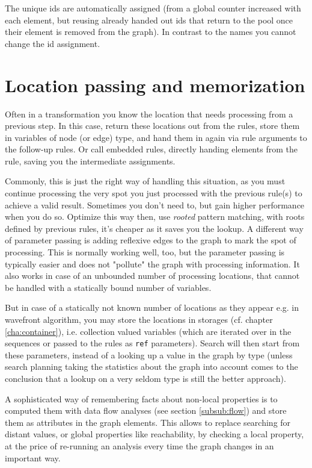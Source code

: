 The unique ids are automatically assigned (from a global counter increased with each element, but reusing already handed out ids that return to the pool once their element is removed from the graph). In contrast to the names you cannot change the id assignment.


\section{Location passing and memorization}
Often in a transformation you know the location that needs processing from a previous step.
In this case, return these locations out from the rules, store them in variables of node (or edge) type, and hand them in again via rule arguments to the follow-up rules.
Or call embedded rules, directly handing elements from the rule, saving you the intermediate assignments.

Commonly, this is just the right way of handling this situation, 
as you must continue processing the very spot you just processed with the previous rule(s) to achieve a valid result.
Sometimes you don't need to, but gain higher performance when you do so.
Optimize this way then, use \emph{rooted} pattern matching, with roots defined by previous rules, it's cheaper as it saves you the lookup.
A different way of parameter passing is adding reflexive edges to the graph to mark the spot of processing.
This is normally working well, too, but the parameter passing is typically easier and does not "pollute" the graph with processing information.
It also works in case of an unbounded number of processing locations, that cannot be handled with a statically bound number of variables.

But in case of a statically not known number of locations as they appear e.g. in wavefront algorithm, you may store the locations in storages (cf. chapter \ref{cha:container}), i.e. collection valued variables (which are iterated over in the sequences or passed to the rules as \texttt{ref} parameters).
Search will then start from these parameters, instead of a looking up a value in the graph by type (unless search planning taking the statistics about the graph into account comes to the conclusion that a lookup on a very seldom type is still the better approach).

A sophisticated way of remembering facts about non-local properties is to computed them with data flow analyses (see section \ref{subsub:flow}) and store them as attributes in the graph elements.
This allows to replace searching for distant values, or global properties like reachability, by checking a local property, at the price of re-running an analysis every time the graph changes in an important way.

